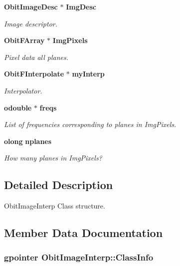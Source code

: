 \begin{CompactItemize}
{\bf Obit\-Image\-Desc} $\ast$ {\bf Img\-Desc}
\begin{CompactList}\small\item\em Image descriptor. \item\end{CompactList}\item 
{\bf Obit\-FArray} $\ast$ {\bf Img\-Pixels}
\begin{CompactList}\small\item\em Pixel data all planes. \item\end{CompactList}\item 
{\bf Obit\-FInterpolate} $\ast$ {\bf my\-Interp}
\begin{CompactList}\small\item\em Interpolator. \item\end{CompactList}\item 
{\bf odouble} $\ast$ {\bf freqs}
\begin{CompactList}\small\item\em List of frequencies corresponding to planes in Img\-Pixels. \item\end{CompactList}\item 
{\bf olong} {\bf nplanes}
\begin{CompactList}\small\item\em How many planes in Img\-Pixels? \item\end{CompactList}\end{CompactItemize}


\subsection{Detailed Description}
Obit\-Image\-Interp Class structure. 



\subsection{Member Data Documentation}
\subsubsection{\setlength{\rightskip}{0pt plus 5cm}gpointer {\bf Obit\-Image\-Interp::Class\-Info}}\label{structObitImageInterp_o1}


